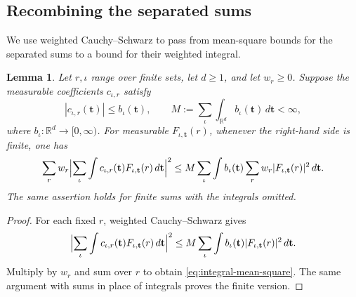 \documentclass[11pt,a4paper]{article}
\numberwithin{equation}{section}
\numberwithin{figure}{section}
\newtheorem{lemma}[theorem]{Lemma}
\theoremstyle{definition}
\theoremstyle{remark}
\newcommand{\dd}{\,d}
\begin{document}
\subsection{Recombining the separated sums}
We use weighted Cauchy--Schwarz to pass from mean-square bounds
for the separated sums to a bound for their weighted integral.

\begin{lemma}\label{lem:recombine}
Let $r,\iota$ range over finite sets, let $d\ge1$, and let $w_r\ge0$.
Suppose the measurable coefficients $c_{\iota,r}$ satisfy
\[
 |c_{\iota,r}(\mathbf t)|\le b_\iota(\mathbf t),\qquad
 M:=\sum_\iota\int_{\mathbb R^d}b_\iota(\mathbf t)\dd\mathbf t<\infty,
\]
where $b_\iota:\mathbb R^d\to[0,\infty)$.
For measurable $F_{\iota,\mathbf t}(r)$, whenever the right-hand
side is finite, one has
\begin{equation}\label{eq:integral-mean-square}
 \sum_r w_r\Bigl|\sum_\iota\int c_{\iota,r}(\mathbf t)
 F_{\iota,\mathbf t}(r)\dd\mathbf t\Bigr|^2
 \le M\sum_\iota\int b_\iota(\mathbf t)
       \sum_r w_r|F_{\iota,\mathbf t}(r)|^2\dd\mathbf t.
\end{equation}
The same assertion holds for finite sums with the integrals omitted.
\end{lemma}
\begin{proof}
For each fixed $r$, weighted Cauchy--Schwarz gives
\[
 \Bigl|\sum_\iota\int c_{\iota,r}(\mathbf t)
 F_{\iota,\mathbf t}(r)\dd\mathbf t\Bigr|^2
 \le M\sum_\iota\int b_\iota(\mathbf t)
 |F_{\iota,\mathbf t}(r)|^2\dd\mathbf t.
\]
Multiply by $w_r$ and sum over $r$ to obtain
\eqref{eq:integral-mean-square}. The same argument with sums in
place of integrals proves the finite version.
\end{proof}
\end{document}
